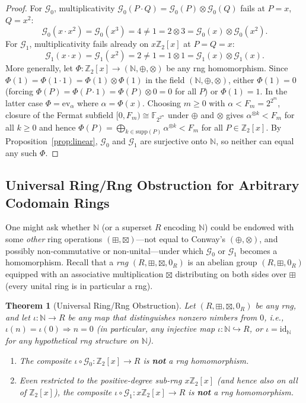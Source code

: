 \documentclass[11pt,a4paper]{article}
\newtheorem{theorem}{Theorem}[section]
\theoremstyle{definition}
\newcommand{\F}{\mathbb{F}}
\newcommand{\Z}{\mathbb{Z}}
\newcommand{\N}{\mathbb{N}}
\newcommand{\SG}{\mathcal{G}}
\newcommand{\supp}{\mathrm{supp}}
\newcommand{\ev}{\mathrm{ev}}
\begin{document}
\begin{proof}
For $\SG_0$, multiplicativity $\SG_0(P \cdot Q) = \SG_0(P) \otimes \SG_0(Q)$ fails at
$P = x$, $Q = x^2$:
\[
  \SG_0(x \cdot x^2) = \SG_0(x^3) = 4 \neq 1 = 2 \otimes 3 = \SG_0(x) \otimes \SG_0(x^2).
\]
For $\SG_1$, multiplicativity fails already on $x\Z_2[x]$ at $P = Q = x$:
\[
  \SG_1(x \cdot x) = \SG_1(x^2) = 2 \neq 1 = 1 \otimes 1 = \SG_1(x) \otimes \SG_1(x).
\]
More generally, let $\Phi : \Z_2[x] \to (\N,\oplus,\otimes)$ be any rng homomorphism. Since
$\Phi(1) = \Phi(1 \cdot 1) = \Phi(1) \otimes \Phi(1)$ in the field $(\N,\oplus,\otimes)$,
either $\Phi(1) = 0$ (forcing $\Phi(P) = \Phi(P \cdot 1) = \Phi(P) \otimes 0 = 0$ for all
$P$) or $\Phi(1) = 1$. In the latter case $\Phi = \ev_\alpha$ where $\alpha = \Phi(x)$.
Choosing $m \ge 0$ with $\alpha < F_m = 2^{2^m}$, closure of the Fermat subfield
$[0, F_m) \cong \F_{2^{2^m}}$ under $\oplus$ and $\otimes$ gives $\alpha^{\otimes k} < F_m$
for all $k \ge 0$ and hence $\Phi(P) = \bigoplus_{k\in\supp(P)} \alpha^{\otimes k} < F_m$
for all $P \in \Z_2[x]$. By Proposition~\ref{prop:linear}, $\SG_0$ and $\SG_1$ are
surjective onto $\N$, so neither can equal any such $\Phi$.
\end{proof}

\subsection{Universal Ring/Rng Obstruction for Arbitrary Codomain Rings}

One might ask whether $\N$ (or a superset $R$ encoding $\N$) could be endowed with some
\emph{other} ring operations $(\boxplus,\boxtimes)$---not equal to Conway's $(\oplus,\otimes)$,
and possibly non-commutative or non-unital---under which $\SG_0$ or $\SG_1$ becomes a
homomorphism. Recall that a \emph{rng} $(R,\boxplus,\boxtimes,0_R)$ is an abelian group
$(R,\boxplus,0_R)$ equipped with an associative multiplication $\boxtimes$ distributing
on both sides over $\boxplus$ (every unital ring is in particular a rng).

\begin{theorem}[Universal Ring/Rng Obstruction]
\label{thm:universal-rng}
Let $(R,\boxplus,\boxtimes,0_R)$ be \emph{any} rng, and let $\iota : \N \to R$ be \emph{any}
map that distinguishes nonzero nimbers from $0$, i.e., $\iota(n) = \iota(0) \Rightarrow n = 0$
(in particular, any injective map $\iota : \N \hookrightarrow R$, or $\iota = \mathrm{id}_\N$
for any hypothetical rng structure on $\N$).
\begin{enumerate}
  \setlength{\itemsep}{2pt}
  \item The composite $\iota \circ \SG_0 : \Z_2[x] \to R$ is \textbf{not} a rng homomorphism.
  \item Even restricted to the positive-degree sub-rng $x\Z_2[x]$ (and hence also on all of
    $\Z_2[x]$), the composite $\iota \circ \SG_1 : x\Z_2[x] \to R$ is \textbf{not} a rng
    homomorphism.
\end{enumerate}
\end{theorem}
\end{document}
